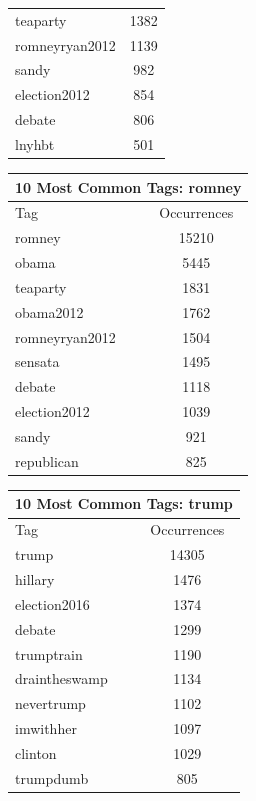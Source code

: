\documentclass[12pt,a4paper]{report}
\begin{document}
\begin{table}[ht]
\begin{tabular}[t]{|l|c|}
      teaparty & 1382 \\
      romneyryan2012 & 1139 \\
      sandy & 982 \\
      election2012 & 854 \\
      debate & 806 \\
      lnyhbt & 501 \\
      \hline
    \end{tabular}\hfill%
    \begin{tabular}[t]{|l|c|}
      \hline
      \multicolumn{2}{|c|}{10 Most Common Tags: romney} \\
      \hline
      Tag & Occurrences \\ [0.5ex]
      \hline
      \hline
      romney & 15210 \\
      obama & 5445 \\
      teaparty & 1831 \\
      obama2012 & 1762 \\
      romneyryan2012 & 1504 \\
      sensata & 1495 \\
      debate & 1118 \\
      election2012 & 1039 \\
      sandy & 921 \\
      republican & 825 \\
      \hline
    \end{tabular}\hfill%
    \begin{tabular}[t]{|l|c|}
      \hline
      \multicolumn{2}{|c|}{10 Most Common Tags: trump} \\
      \hline
      Tag & Occurrences \\ [0.5ex]
      \hline
      \hline
      trump & 14305 \\
      hillary & 1476 \\
      election2016 & 1374 \\
      debate & 1299 \\
      trumptrain & 1190 \\
      draintheswamp & 1134 \\
      nevertrump & 1102 \\
      imwithher & 1097 \\
      clinton & 1029 \\
      trumpdumb & 805 \\
      \hline
    \end{tabular}\hfill%
    \begin{tabular}[t]{|l|c|}
      \hline

\end{tabular}
\end{table}
\end{document}

